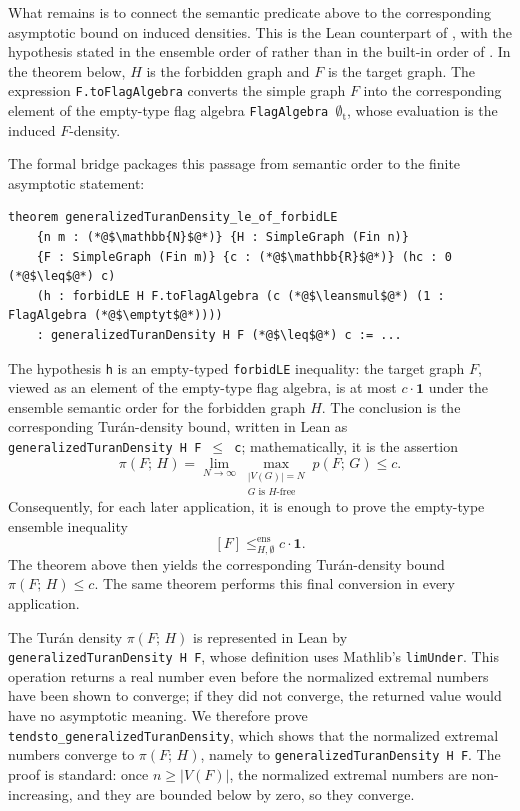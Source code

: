 \documentclass{article}
\newcommand{\den}[2]{p(#1;\,#2)}
\newcommand{\tdensity}[2]{\pi(#1;\,#2)}
\newcommand{\lean}[1]{\texttt{#1}}
\newcommand{\emptyt}{\emptyset_{\mathrm{t}}}
\newcommand{\leansmul}{\mathbin{\vcenter{\hbox{$\scriptstyle\bullet$}}}}
\begin{document}
What remains is to connect
the semantic predicate above to the corresponding asymptotic bound on induced densities.
This is the Lean counterpart of , with the hypothesis
stated in the ensemble order of  rather than
in the built-in order of .
In the theorem below, \(H\) is
the forbidden graph and \(F\) is the target graph.  The expression \lean{F.toFlagAlgebra} converts
the simple graph \(F\) into the corresponding element of the empty-type flag
algebra \lean{FlagAlgebra $\emptyt$}, whose evaluation is the induced
\(F\)-density.

The formal bridge packages this passage from semantic order to the finite
asymptotic statement:
\begin{lstlisting}
theorem generalizedTuranDensity_le_of_forbidLE
    {n m : (*@$\mathbb{N}$@*)} {H : SimpleGraph (Fin n)}
    {F : SimpleGraph (Fin m)} {c : (*@$\mathbb{R}$@*)} (hc : 0 (*@$\leq$@*) c)
    (h : forbidLE H F.toFlagAlgebra (c (*@$\leansmul$@*) (1 : FlagAlgebra (*@$\emptyt$@*))))
    : generalizedTuranDensity H F (*@$\leq$@*) c := ...
\end{lstlisting}
The hypothesis \lean{h} is an empty-typed \lean{forbidLE} inequality: the target
graph \(F\), viewed as an element of the empty-type flag algebra, is at most
\(c\cdot \mathbf{1}\) under the ensemble semantic order for the forbidden
graph \(H\).  The conclusion is the corresponding
Tur\'an-density bound, written in Lean as
\lean{generalizedTuranDensity~H~F~$\leq$~c}; mathematically, it is the assertion
\[
  \tdensity{F}{H}
  =
  \lim_{N\to\infty}
  \max_{\substack{|V(G)|=N\\ G\text{ is }H\text{-free}}}
  \den{F}{G}
  \leq c .
\]
Consequently, for each later application, it is enough to prove the empty-type
ensemble inequality
\[
  [F]\leq^{\mathrm{ens}}_{H,\emptyset}c\cdot\mathbf{1}.
\]
The theorem above then yields the corresponding Tur\'an-density bound
\(\tdensity{F}{H}\leq c\).  The same theorem performs this final conversion in
every application.

The Tur\'an density \(\tdensity{F}{H}\) is represented in Lean by
\lean{generalizedTuranDensity H F}, whose definition uses Mathlib's
\lean{limUnder}.  This operation returns a real number even before the
normalized extremal numbers have been shown to converge; if they did not
converge, the returned value would have no asymptotic meaning.  We therefore
prove \lean{tendsto\_\allowbreak generalizedTuranDensity}, which shows that the
normalized extremal numbers converge to \(\tdensity{F}{H}\), namely to
\lean{generalizedTuranDensity H F}.  The proof is standard: once
\(n\geq |V(F)|\), the normalized extremal numbers are non-increasing, and they
are bounded below by zero, so they converge.
\end{document}
